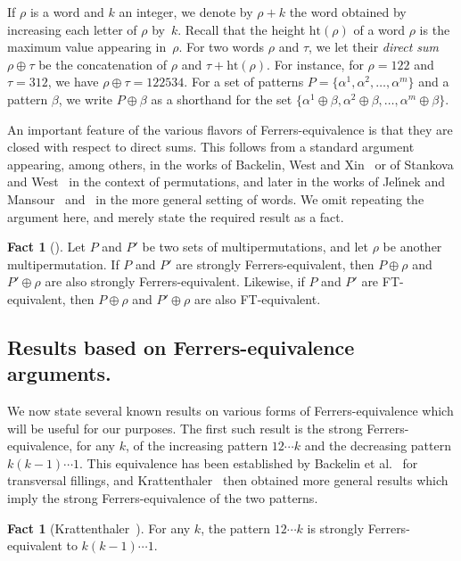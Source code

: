 \documentclass[11pt]{amsart}
\theoremstyle{plain}
\theoremstyle{definition}
\newtheorem{fact}[theorem]{Fact}
\newcommand{\he}{\text{ht}}
\begin{document}
If $\rho$ is a word and $k$ an integer, we denote by $\rho+k$ the word obtained by increasing
each letter of $\rho$ by~$k$. Recall that the height $\he(\rho)$ of a word $\rho$ is the maximum
value appearing in~$\rho$. For two words $\rho$ and $\tau$, we let their \emph{direct sum}
$\rho\oplus\tau$ be the concatenation of $\rho$ and $\tau+\he(\rho)$.
For instance, for $\rho=122$ and $\tau=312$, we have $\rho\oplus\tau=122534$. For a set of patterns
$P=\{\alpha^1, \alpha^2,\dotsc,\alpha^m\}$ and a pattern $\beta$, we write $P\oplus\beta$ as a
shorthand for the set $\{\alpha^1\oplus\beta, \alpha^2\oplus\beta,\dotsc,\alpha^m\oplus\beta\}$.

An important feature of the various flavors of Ferrers-equivalence is that they are closed with
respect to direct sums. This follows from a standard argument appearing, among others, in the works
of Backelin, West and Xin~\cite[Proposition 2.3]{bwx} or of Stankova and
West~\cite[Proposition~1]{SW} in the context of permutations, and later in the works of Jel{\'\i}nek
and Mansour~\cite[Lemma 2.1]{JM1} and~\cite[Lemma 14]{JM0} in the more general setting of words. We
omit repeating the argument here, and merely state the required result as a fact.

\begin{fact}[\cite{bwx,JM0,JM1,SW}]\label{fac-plus}
Let $P$ and $P'$ be two sets of multipermutations, and let $\rho$ be another multipermutation. If $P$
and $P'$ are strongly Ferrers-equivalent, then $P\oplus \rho$ and $P'\oplus \rho$ are also strongly
Ferrers-equivalent. Likewise, if $P$ and $P'$ are FT-equivalent, then $P\oplus \rho$ and $P'\oplus
\rho$ are also FT-equivalent.
\end{fact}

\subsection{Results based on Ferrers-equivalence arguments.}

We now state several known results on various forms of Ferrers-equivalence which will be useful for
our purposes. The first such result is the strong Ferrers-equivalence, for any $k$, of the
increasing pattern $12\dotsb k$ and the decreasing pattern $k(k-1)\dotsb 1$. This equivalence has
been established by Backelin et al.~\cite{bwx} for transversal fillings, and Krattenthaler~\cite{kra}
then obtained more general results which imply the strong Ferrers-equivalence of the two patterns.

\begin{fact}[Krattenthaler~\cite{kra}]\label{fac-diag} For any $k$, the pattern $12\dotsb k$ is
strongly Ferrers-equivalent to $k(k-1)\dotsb 1$.
\end{fact}
\end{document}
